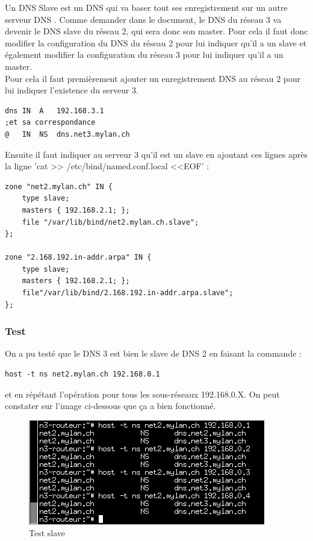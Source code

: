 \documentclass{article}
\begin{document}
Un DNS Slave est un DNS qui va baser tout ses enregistrement sur un autre serveur DNS \cite{Slave}. Comme demander dans le document, le DNS du réseau 3 va devenir le DNS slave du réseau 2, qui sera donc son master. Pour cela il faut donc modifier la configuration du DNS du réseau 2 pour lui indiquer qu'il a un slave et également modifier la configuration du réseau 3 pour lui indiquer qu'il a un master.\\

Pour cela il faut premièrement ajouter un enregistrement DNS au réseau 2 pour lui indiquer l'existence du serveur 3.

\begin{lstlisting}
dns	IN	A	192.168.3.1
;et sa correspondance
@	IN	NS	dns.net3.mylan.ch
\end{lstlisting}

Ensuite il faut indiquer au serveur 3 qu'il est un slave en ajoutant ces lignes après la ligne 'cat >> /etc/bind/named.conf.local <<EOF' : 

\begin{lstlisting}
zone "net2.mylan.ch" IN {
	type slave;
	masters { 192.168.2.1; };
	file "/var/lib/bind/net2.mylan.ch.slave";
};

zone "2.168.192.in-addr.arpa" IN {
	type slave;
	masters { 192.168.2.1; };
	file"/var/lib/bind/2.168.192.in-addr.arpa.slave";
};
\end{lstlisting}

\subsubsection{Test}

On a pu testé que le DNS 3 est bien le slave de DNS 2 en faisant la commande : 

\begin{lstlisting}
host -t ns net2.mylan.ch 192.168.0.1
\end{lstlisting}

et en répétant l'opération pour tous les sous-réseaux 192.168.0.X. On peut constater sur l'image ci-dessous que ça a bien fonctionné.

\begin{figure}[h]
	\centering
	\includegraphics{./captures/part1part3.png}
	\caption{Test slave}
	\label{fig:Test slave}
\end{figure}
\end{document}
